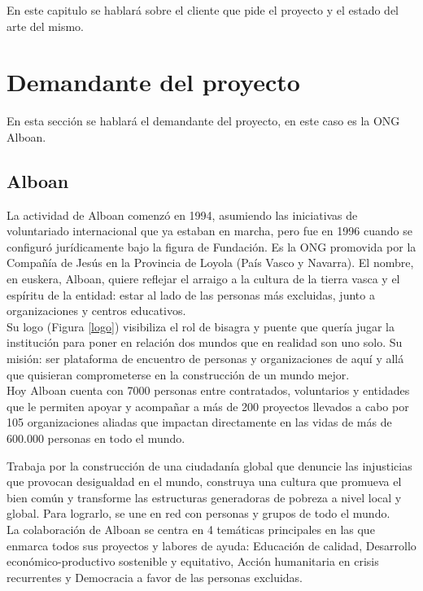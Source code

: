 En este capitulo se hablará sobre el cliente que pide el proyecto y el estado del arte del mismo.

\section{Demandante del proyecto}
En esta sección se hablará el demandante del proyecto, en este caso es la ONG Alboan.

\subsection{Alboan}

La actividad de Alboan\cite{alboan} comenzó en 1994, asumiendo las iniciativas de voluntariado
internacional que ya estaban en marcha, pero fue en 1996 cuando se configuró
jurídicamente bajo la figura de Fundación. Es la ONG promovida por la Compañía de Jesús en la Provincia de Loyola (País Vasco y Navarra). El nombre, en euskera, Alboan, quiere reflejar el arraigo a la cultura de la tierra vasca y el espíritu de la entidad: estar al lado de las personas más excluidas, junto a organizaciones y centros educativos.\\

Su logo (Figura \ref{logo}) visibiliza  el rol de bisagra y puente que quería jugar la institución para poner en relación dos mundos que en realidad son uno solo. Su misión: ser plataforma de encuentro de personas y organizaciones de aquí y allá que quisieran comprometerse en la construcción de un mundo mejor.\\

Hoy Alboan cuenta con 7000 personas entre contratados, voluntarios y entidades que le permiten apoyar y acompañar a más de 200 proyectos llevados a cabo por 105 organizaciones
aliadas que impactan directamente en las vidas de más de 600.000 personas en todo
el mundo.


Trabaja por la construcción de una ciudadanía global que denuncie las injusticias que provocan desigualdad en el mundo, construya una cultura que promueva el bien común y transforme las estructuras generadoras de pobreza a nivel local y global. Para lograrlo, se une en red con personas y grupos de todo el mundo.\\

La colaboración de Alboan se centra en 4 temáticas principales en las que enmarca todos sus proyectos y labores de ayuda: Educación de calidad, Desarrollo económico-productivo sostenible y equitativo, Acción humanitaria en crisis recurrentes y Democracia a favor de las personas excluidas.\\

